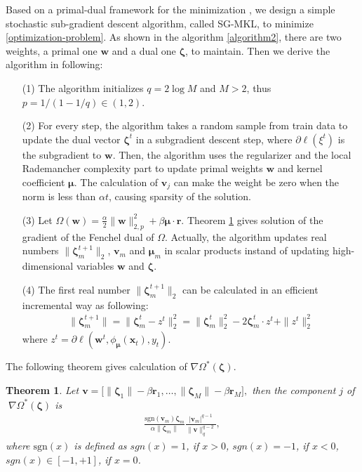 \documentclass{article}
\newtheorem{theorem}{Theorem}
\begin{document}
Based on a primal-dual framework for the minimization \cite{Shalev-ShwartzK08, OrabonaL11},
we design a simple stochastic sub-gradient descent algorithm, called SG-MKL, to minimize \eqref{optimization-problem}.
As shown in the algorithm \ref{algorithm2}, there are two weights, a primal one $\mathbf{w}$ and a dual one $\mathbf{\zeta}$, to maintain.
Then we derive the algorithm in following:
\begin{itemize}
\item[(1)]The algorithm initializes $q=2\log M$ and $M>2$, thus $p=1/(1-1/q) \in (1,2)$.
\item[(2)] For every step, the algorithm takes a random sample from train data to update
    the dual vector $\mathbf{\zeta}^t$ in a subgradient descent step, where $\partial{\ell(\xi^t)}$ is the subgradient to $\mathbf{w}$.
    Then, the algorithm uses the regularizer and the local Rademancher complexity
    part to update primal weights $\mathbf{w}$ and kernel coefficient $\mathbf{\mu}$.
    The calculation of $\mathbf{v}_j$ can make the weight be zero when the norm is less than $\alpha t$,
    causing sparsity of the solution.
\item[(3)] Let $\Omega(\mathbf{w})=\frac{\alpha}{2}\|\mathbf{w}\|_{2,p}^2 + \beta\mathbf{\mu} \cdot \mathbf{r}$.
            Theorem \ref{theorem-fenchel-dual} gives solution of the gradient of the Fenchel dual of $\Omega$.
            Actually, the algorithm updates real numbers $\|\mathbf{\zeta}_m^{t+1}\|_2$, $\mathbf{v}_m$
            and $\mathbf{\mu}_m$ in scalar products instand of updating high-dimensional variables $\mathbf{w}$ and $\mathbf{\zeta}$.
 \item[(4)] The first real number $\|\mathbf{\zeta}_m^{t+1}\|_2$ can be calculated in an efficient incremental way as following:
            \begin{align*}
                \|\mathbf{\zeta}_m^{t+1}\|
                =\|\mathbf{\zeta}_m^{t}-z^t\|_2^2
                =\|\mathbf{\zeta}_m^{t}\|_2^2-2\mathbf{\zeta}_m^t \cdot z^t +\|z^t\|_2^2
            \end{align*}
            where $z^t=\partial\ell(\mathbf{w}^t,\phi_{\bm \mu}(\mathbf{x}_t), y_t)$.
 \end{itemize}

 The following theorem gives calculation of $\nabla\Omega^\ast(\mathbf{\zeta})$.
 \begin{theorem}
\label{theorem-fenchel-dual}
Let
$
    \mathbf{v}=\Big[\|\mathbf{\zeta}_1\|-\beta\mathbf{r}_1,\ldots,
    \|\mathbf{\zeta}_M\|-\beta\mathbf{r}_M\Big],
$
then the component $j$ of $\;\nabla\Omega^\ast(\mathbf{\zeta})$ is
\begin{align*}
\frac{\mathrm{sgn}(\mathbf{v}_m) \mathbf{\zeta}_m}{\alpha\|\mathbf{\zeta}_m\|}
       \frac{|\mathbf{v}_m|^{q-1}}{\|\mathbf{v}\|_q^{q-2}},
\end{align*}
where $\mathrm{sgn}(x)$ is defined as
$sgn(x)=1$, if $x>0$, $sgn(x)=-1$, if $x<0$,
$sgn(x)\in[-1,+1]$, if $x=0$.
\end{theorem}
\end{document}
